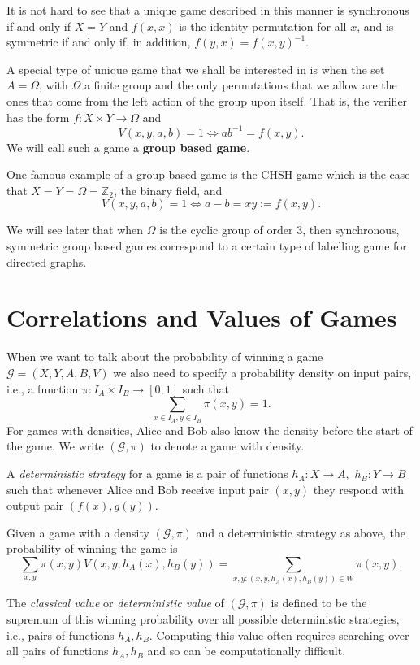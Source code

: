 \documentclass[11pt]{amsart}
\theoremstyle{definition}
\newcommand{\bb}[1]{\mathbb{#1}}
\newcommand{\cl}[1]{\mathcal{#1}}
\begin{document}
It is not hard to see that a unique game described in this manner is synchronous if and only if $X=Y$ and $f(x,x)$ is the identity permutation for all $x$, and is symmetric if and only if, in addition, $f(y,x) = f(x,y)^{-1}$.

A special type of unique game that we shall be interested in is when the set $A= \Omega$, with $\Omega$ a finite group and the only permutations that we allow are the ones that come from the left action of the group upon itself. That is, the verifier has the form $f:X \times Y \to \Omega$ and
\[ V(x,y,a,b) =1 \iff ab^{-1} = f(x,y).\] We will call such a game a {\bf group based game}.

One famous example of a group based game is the CHSH game which is the case that $X=Y= \Omega = \bb Z_2$, the binary field,
and
\[ V(x,y,a,b) =1 \iff a -b = xy:= f(x,y).\]

We will see later that when $\Omega$ is the cyclic group of order 3, then synchronous, symmetric group based games correspond to a certain type of labelling game for directed graphs.

\section{Correlations and Values of Games}

 When we want to talk about the probability of winning  a game $\cl G= (X, Y, A, B, V)$ we also need to specify a probability density on input pairs, i.e., a function $\pi: I_A \times I_B \to [0,1]$ such that
 \[ \sum_{x \in I_A, y \in I_B} \pi(x,y) =1.\]
 For games with densities, Alice and Bob also know the density before the start of the game.
 We write $(\cl G, \pi)$ to denote a game with density.

 A {\it deterministic strategy} for a game is a pair of functions $h_A: X \to A, \,\, h_B:Y \to B$ such that whenever Alice and Bob receive input pair $(x,y)$ they respond with output pair $(f(x), g(y))$.

 Given a game with a density $(\cl G, \pi)$ and a deterministic strategy as above, the probability of winning the game is
 \[ \sum_{x,y} \pi(x,y) V(x, y, h_A(x), h_B(y))= \sum_{x,y\colon(x,y,h_A(x),h_B(y)) \in W} \pi(x,y).\]

 The {\it classical value} or {\it deterministic value} of $(\cl G, \pi)$ is defined to be the supremum of this winning probability over all possible deterministic strategies, i.e., pairs of functions $h_A, h_B$. Computing this value often requires searching over all pairs of functions $h_A, h_B$ and so can be computationally difficult. %
\end{document}
